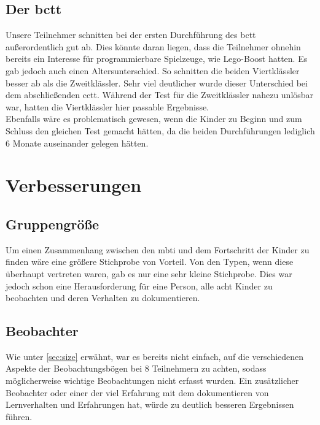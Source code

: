 \subsection{Der \acrlong{bctt}} \label{sec:problemCTT}
Unsere Teilnehmer schnitten bei der ersten Durchführung des \acrshort{bctt} außerordentlich gut ab. Dies könnte daran liegen, dass die Teilnehmer ohnehin bereits ein Interesse für programmierbare Spielzeuge, wie \gls{Lego}-Boost hatten. Es gab jedoch auch einen Altersunterschied. So schnitten die beiden Viertklässler besser ab als die Zweitklässler. Sehr viel deutlicher wurde dieser Unterschied bei dem abschließenden \acrshort{cctt}. Während der Test für die Zweitklässler nahezu unlösbar war, hatten die Viertklässler hier passable Ergebnisse.\\
Ebenfalls wäre es problematisch gewesen, wenn die Kinder zu Beginn und zum Schluss den gleichen Test gemacht hätten, da die beiden Durchführungen lediglich 6 Monate auseinander gelegen hätten.


\section{Verbesserungen}
\subsection*{Gruppengröße}\label{sec:size}
Um einen Zusammenhang zwischen den \acrlong{mbti} und dem Fortschritt der Kinder zu finden wäre eine größere Stichprobe von Vorteil. Von den Typen, wenn diese überhaupt vertreten waren, gab es  nur eine sehr kleine Stichprobe. Dies war jedoch schon eine Herausforderung für eine Person, alle acht Kinder zu beobachten und deren Verhalten zu dokumentieren.

\subsection*{Beobachter}
Wie unter \ref{sec:size} erwähnt, war es bereits nicht einfach, auf die verschiedenen Aspekte der Beobachtungsbögen bei 8 Teilnehmern zu achten, sodass möglicherweise wichtige Beobachtungen nicht erfasst wurden. Ein zusätzlicher Beobachter oder einer der viel Erfahrung mit dem dokumentieren von Lernverhalten und Erfahrungen hat, würde zu deutlich besseren Ergebnissen führen.

